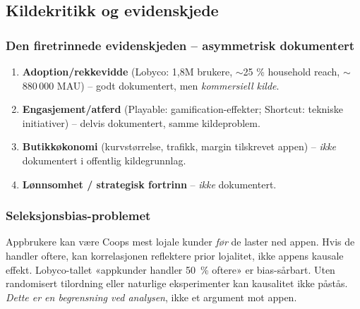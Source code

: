 \subsection{Kildekritikk og evidenskjede}

\subsubsection*{Den firetrinnede evidenskjeden -- asymmetrisk dokumentert}
\begin{enumerate}
  \item \textbf{Adoption/rekkevidde} (Lobyco: 1{,}8M brukere, $\sim$25 \%
    household reach, $\sim$880\,000 MAU) -- godt dokumentert, men
    \emph{kommersiell kilde}.
  \item \textbf{Engasjement/atferd} (Playable: gamification-effekter;
    Shortcut: tekniske initiativer) -- delvis dokumentert, samme
    kildeproblem.
  \item \textbf{Butikkøkonomi} (kurvstørrelse, trafikk, margin tilskrevet
    appen) -- \emph{ikke} dokumentert i offentlig kildegrunnlag.
  \item \textbf{Lønnsomhet / strategisk fortrinn} -- \emph{ikke}
    dokumentert.
\end{enumerate}

\subsubsection*{Seleksjonsbias-problemet}
Appbrukere kan være Coops mest lojale kunder \emph{før} de laster ned
appen. Hvis de handler oftere, kan korrelasjonen reflektere prior lojalitet,
ikke appens kausale effekt. Lobyco-tallet «appkunder handler 50~\% oftere»
er bias-sårbart. Uten randomisert tilordning eller naturlige eksperimenter
kan kausalitet ikke påstås. \emph{Dette er en begrensning ved analysen},
ikke et argument mot appen.

